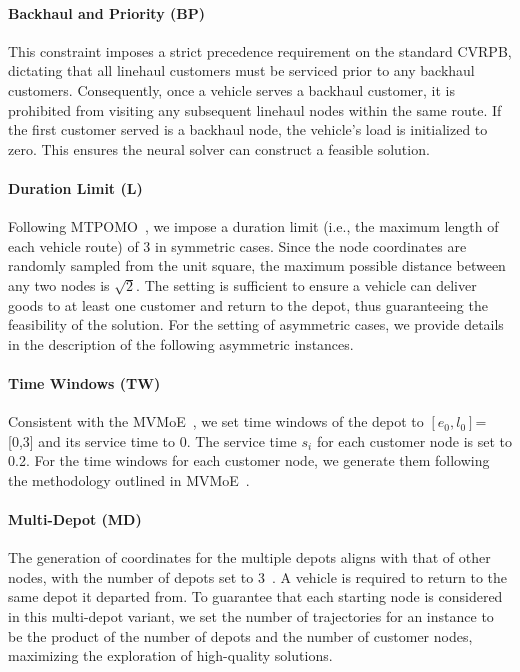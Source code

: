 \documentclass{article}
\theoremstyle{plain}
\theoremstyle{definition}
\theoremstyle{remark}
\begin{document}
\paragraph{Backhaul and Priority (BP)}
This constraint imposes a strict precedence requirement on the standard CVRPB, dictating that all linehaul customers must be serviced prior to any backhaul customers. Consequently, once a vehicle serves a backhaul customer, it is prohibited from visiting any subsequent linehaul nodes within the same route. If the first customer served is a backhaul node, the vehicle's load is initialized to zero. This ensures the neural solver can construct a feasible solution.
\paragraph{Duration Limit (L)}
Following MTPOMO~\citep{liu2024mtpomo}, we impose a duration limit (i.e., the maximum length of each vehicle route) of 3 in symmetric cases. Since the node coordinates are randomly sampled from the unit square, the maximum possible distance between any two nodes is $\sqrt{2}$. The setting is sufficient to ensure a vehicle can deliver goods to at least one customer and return to the depot, thus guaranteeing the feasibility of the solution. For the setting of asymmetric cases, we provide details in the description of the following asymmetric instances.
\paragraph{Time Windows (TW)}
Consistent with the MVMoE~\citep{zhou2024mvmoe}, we set time windows of the depot to $[e_0,l_0]$=[0,3] and its service time to 0. The service time $s_i$ for each customer node is set to 0.2. For the time windows for each customer node, we generate them following the methodology outlined in MVMoE~\citep{zhou2024mvmoe}.

\paragraph{Multi-Depot (MD)}
The generation of coordinates for the multiple depots aligns with that of other nodes, with the number of depots set to 3~\citep{berto2024routefinder}. A vehicle is required to return to the same depot it departed from. To guarantee that each starting node is considered in this multi-depot variant, we set the number of trajectories for an instance to be the product of the number of depots and the number of customer nodes, maximizing the exploration of high-quality solutions.
\end{document}
